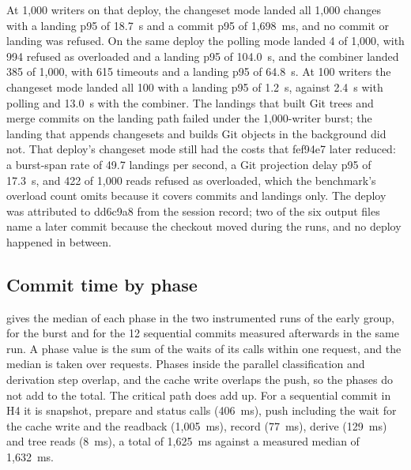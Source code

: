 \documentclass[11pt,letterpaper]{article}
\theoremstyle{definition}
\theoremstyle{remark}
\begin{document}
At 1,000 writers on that deploy, the changeset mode landed all 1,000 changes with a landing p95 of 18.7~s and a commit p95 of 1,698~ms, and no commit or landing was refused. %
On the same deploy the polling mode landed 4 of 1,000, with 994 refused as overloaded and a landing p95 of 104.0~s, and the combiner landed 385 of 1,000, with 615 timeouts and a landing p95 of 64.8~s. %
At 100 writers the changeset mode landed all 100 with a landing p95 of 1.2~s, against 2.4~s with polling and 13.0~s with the combiner. %
The landings that built Git trees and merge commits on the landing path failed under the 1,000-writer burst; the landing that appends changesets and builds Git objects in the background did not. That deploy's changeset mode still had the costs that fef94e7 later reduced: a burst-span rate of 49.7 landings per second, a Git projection delay p95 of 17.3~s, and 422 of 1,000 reads refused as overloaded, which the benchmark's overload count omits because it covers commits and landings only. %
The deploy was attributed to dd6c9a8 from the session record; two of the six output files name a later commit because the checkout moved during the runs, and no deploy happened in between. %

\subsection{Commit time by phase}

 gives the median of each phase in the two instrumented runs of the early group, for the burst and for the 12 sequential commits measured afterwards in the same run. A phase value is the sum of the waits of its calls within one request, and the median is taken over requests. Phases inside the parallel classification and derivation step overlap, and the cache write overlaps the push, so the phases do not add to the total. The critical path does add up. For a sequential commit in H4 it is snapshot, prepare and status calls (406~ms), push including the wait for the cache write and the readback (1,005~ms), record (77~ms), derive (129~ms) and tree reads (8~ms), a total of 1,625~ms against a measured median of 1,632~ms. %
\end{document}
